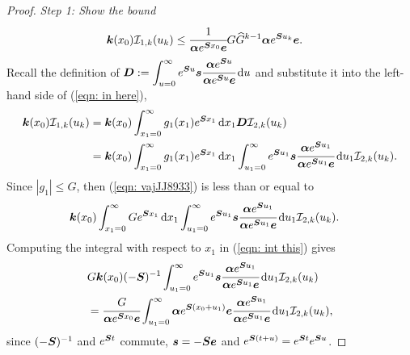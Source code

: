 \begin{proof}

	\emph{Step 1: Show the bound}
	\begin{align}
		\boldsymbol k(x_0)\mathcal I_{1,k}(u_k) 
            	&\leq \cfrac{1}{\boldsymbol \alpha e^{\boldsymbol{S}x_0}\boldsymbol e}G\widehat G^{k-1} \boldsymbol \alpha e^{\boldsymbol{S}u_k}\boldsymbol e.\label{eqn: in here}
	\end{align}
	Recall the definition of \(\boldsymbol{D}:=\displaystyle\int_{u=0}^\infty e^{\boldsymbol{S}u}\boldsymbol s \cfrac{\boldsymbol \alpha e^{\boldsymbol{S}u}}{\boldsymbol \alpha e^{\boldsymbol{S}u}\boldsymbol e}\, \mathrm{d} u\) and substitute it into the left-hand side of (\ref{eqn: in here}), 
	\begin{align}
		\boldsymbol k(x_0) \mathcal I_{1,k}(u_k) &=\boldsymbol k(x_0) \int_{x_1=0}^\infty g_1(x_1) e^{\boldsymbol{S}x_1} \, \mathrm{d} x_1 \boldsymbol{D} \mathcal I_{2,k}(u_k) \nonumber 
		\\&=\boldsymbol k(x_0)\int_{x_1=0}^\infty g_1(x_1) e^{\boldsymbol{S}x_1} \, \mathrm{d} x_1 \int_{u_1=0}^\infty e^{\boldsymbol{S}u_1}\boldsymbol s \cfrac{\boldsymbol \alpha e^{\boldsymbol{S}u_1}}{\boldsymbol \alpha e^{\boldsymbol{S}u_1}\boldsymbol e}\, \mathrm{d} u_1 \mathcal I_{2,k}(u_k). \label{eqn: vajJJ8933}
	\end{align}
	Since \(|g_1|\leq G\), then (\ref{eqn: vajJJ8933}) is less than or equal to
	\begin{align}
		&\boldsymbol k(x_0) \int_{x_1=0}^\infty G  e^{\boldsymbol{S}x_1} \, \mathrm{d} x_1 \int_{u_1=0}^\infty e^{\boldsymbol{S}u_1}\boldsymbol s \cfrac{\boldsymbol \alpha e^{\boldsymbol{S}u_1}}{\boldsymbol \alpha e^{\boldsymbol{S}u_1}\boldsymbol e}\, \mathrm{d} u_1 \mathcal I_{2,k}(u_k).\label{eqn: int this}
	\end{align}
	Computing the integral with respect to \(x_1\) in (\ref{eqn: int this}) gives 
	\begin{align}
		 &G  \boldsymbol k(x_0)(-\boldsymbol{S})^{-1} \int_{u_1=0}^\infty e^{\boldsymbol{S}u_1}\boldsymbol s \cfrac{\boldsymbol \alpha e^{\boldsymbol{S}u_1}}{\boldsymbol \alpha e^{\boldsymbol{S}u_1}\boldsymbol e}\, \mathrm{d} u_1 \mathcal I_{2,k}(u_k)  \nonumber
		\\&=\cfrac{G}{\boldsymbol \alpha e^{\boldsymbol{S}x_0}\boldsymbol e} \int_{u_1=0}^\infty \boldsymbol \alpha e^{\boldsymbol{S}(x_0+u_1)}\boldsymbol e \cfrac{\boldsymbol \alpha e^{\boldsymbol{S}u_1}}{\boldsymbol \alpha e^{\boldsymbol{S}u_1}\boldsymbol e}\, \mathrm{d} u_1\mathcal I_{2,k}(u_k), \label{eqn: yet another label}
	\end{align}
	since \((-\boldsymbol{S})^{-1}\) and \(e^{\boldsymbol{S}t}\) commute, \(\boldsymbol s = - \boldsymbol{S} \boldsymbol e \) and \(e^{\boldsymbol{S}(t+u)} = e^{\boldsymbol{S}t}e^{\boldsymbol{S}u}\). 

\end{proof}
